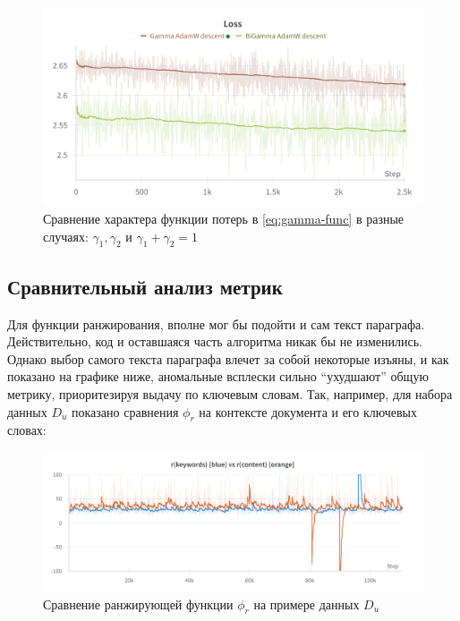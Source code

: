 \begin{figure}[ht]
    \centering
    \includegraphics[width=\columnwidth]{figures/Loss-BiGamma-vs-Gamma.png} %
    \caption{Сравнение характера функции потерь в \eqref{eq:gamma-func} в разные случаях: $\gamma_1, \gamma_2$ и $\gamma_1 + \gamma_2=1$}
    \label{fig:comparison-gammas}
\end{figure}

\subsection{Сравнительный анализ метрик}

Для функции ранжирования, вполне мог бы подойти и сам текст параграфа. Действительно, код и оставшаяся часть алгоритма никак бы не изменились. 
Однако выбор самого текста параграфа влечет за собой некоторые изъяны, и как показано на графике ниже, аномальные всплески сильно ``ухудшают'' общую метрику, 
приоритезируя выдачу по ключевым словам. Так, например, для набора данных $D_u$ показано сравнения $\phi_r$ на контексте документа и его ключевых словах:

\begin{figure}[ht]
    \centering
    \includegraphics[width=\columnwidth]{figures/idf-recall-content-vs-keywords.png} %
    \caption{Сравнение ранжирующей функции $\phi_r$ на примере данных $D_u$}
    \label{fig:comparison-phir-content-vs-keywords}
\end{figure}

